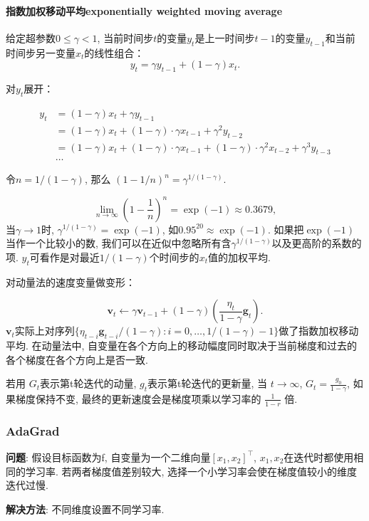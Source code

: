 \documentclass[a4paper]{article}
\theoremstyle{definition}
\numberwithin{equation}{section}
\begin{document}
 \paragraph{指数加权移动平均exponentially weighted moving average}
 给定超参数$0 \leq \gamma < 1$, 当前时间步$t$的变量$y_t$是上一时间步$t-1$的变量$y_{t-1}$和当前时间步另一变量$x_t$的线性组合：
 $$y_t = \gamma y_{t-1} + (1-\gamma) x_t.$$

对$y_t$展开：

 $$
 \begin{aligned}
 y_t  &= (1-\gamma) x_t + \gamma y_{t-1}\\
          &= (1-\gamma)x_t + (1-\gamma) \cdot \gamma x_{t-1} + \gamma^2y_{t-2}\\
          &= (1-\gamma)x_t + (1-\gamma) \cdot \gamma x_{t-1} + (1-\gamma) \cdot \gamma^2x_{t-2} + \gamma^3y_{t-3}\\
          &\ldots
 \end{aligned}
 $$
 
 令$n = 1/(1-\gamma)$, 那么 $\left(1-1/n\right)^n = \gamma^{1/(1-\gamma)}$. 
 
 $$ \lim_{n \rightarrow \infty}  \left(1-\frac{1}{n}\right)^n = \exp(-1) \approx 0.3679, $$
 当$\gamma \rightarrow 1$时, $\gamma^{1/(1-\gamma)}=\exp(-1)$, 如$0.95^{20} \approx \exp(-1)$. 如果把$\exp(-1)$当作一个比较小的数, 我们可以在近似中忽略所有含$\gamma^{1/(1-\gamma)}$以及更高阶的系数的项.  
 $y_t$可看作是对最近$1/(1-\gamma)$个时间步的$x_t$值的加权平均. 


对动量法的速度变量做变形：

 $$\boldsymbol{v}_t \leftarrow \gamma \boldsymbol{v}_{t-1} + (1 - \gamma) \left(\frac{\eta_t}{1 - \gamma} \boldsymbol{g}_t\right). $$
$\boldsymbol{v}_t$实际上对序列$\{\eta_{t-i}\boldsymbol{g}_{t-i} /(1-\gamma):i=0, \ldots, 1/(1-\gamma)-1\}$做了指数加权移动平均. 在动量法中, 自变量在各个方向上的移动幅度同时取决于当前梯度和过去的各个梯度在各个方向上是否一致. 

若用 $G_t$表示第t轮迭代的动量,  $g_t$表示第t轮迭代的更新量, 当 $t \to \infty $,  $G_t= \frac{g_0}{1-\gamma} $, 如果梯度保持不变, 最终的更新速度会是梯度项乘以学习率的 $\frac{1}{1-r}$ 倍. 

\subsubsection{AdaGrad}
\textbf{问题}: 假设目标函数为f, ⾃变量为一个二维向量$[x_1,  x_2]^\top$, $x_1, x_2$在迭代时都使用相同的学习率. 若两者梯度值差别较大, 选择一个小学习率会使在梯度值较小的维度迭代过慢. \\
\par \textbf{解决方法}: 不同维度设置不同学习率. 
\end{document}

